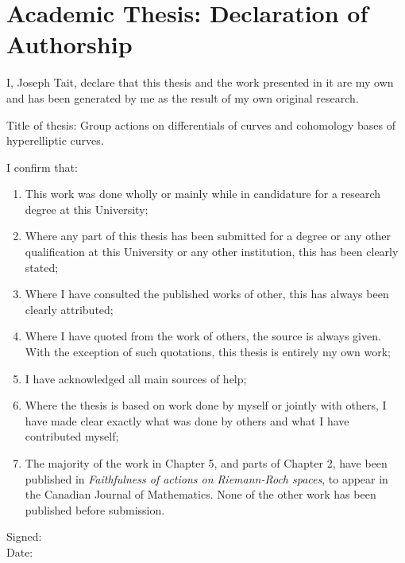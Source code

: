 \documentclass{ecsthesis}      %
\begin{document}
\chapter*{\Large \textbf{Academic Thesis: Declaration of Authorship}} 
I, Joseph Tait, declare that this thesis and the work presented in it are my own and has been generated by me as the result of my own original research.

Title of thesis: Group actions on differentials of curves and cohomology bases of hyperelliptic curves.

I confirm that:
    \begin{enumerate}
    \item This work was done wholly or mainly while in candidature for a research degree at this University;
    \item Where any part of this thesis has been submitted for a degree or any other qualification at this University or any other institution, this has been clearly stated;
    \item Where I have consulted the published works of other, this has always been clearly attributed;
    \item Where I have quoted from the work of others, the source is always given. With the exception of such quotations, this thesis is entirely my own work;
    \item I have acknowledged all main sources of help;
    \item Where the thesis is based on work done by myself or jointly with others, I have made clear exactly what was done by others and what I have contributed myself;
    \item The majority of the work in Chapter 5, and parts of Chapter 2, have been published in \emph{Faithfulness of actions on Riemann-Roch spaces}, to appear in the Canadian Journal of Mathematics. None of the other work has been published before submission.
    \end{enumerate}

Signed:\\

Date: \\
\end{document}
